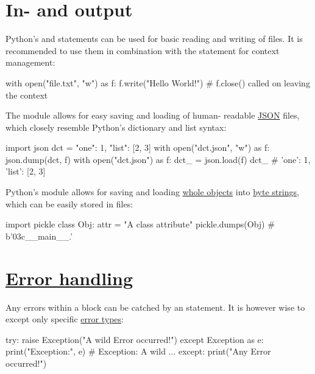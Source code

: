 \documentclass[rules]{cheatsheet}
\begin{document}
\section{In- and output}

Python's  and  statements can be used for basic reading and writing of files. It is recommended to use them in combination with the \href{https://docs.python.org/3/reference/compound_stmts.html#with}{} statement for context management:
\begin{python}
  with open("file.txt", "w") as f:
    f.write("Hello World!")
  # f.close() called on leaving the context
\end{python}

The \href{https://docs.python.org/3/library/json.html}{} module allows for easy saving and loading of human- readable \href{https://www.json.org/}{JSON} files, which closely resemble Python's dictionary and list syntax:
\begin{python}
  import json
  dct = {"one": 1, "list": [2, 3]}
  with open("dct.json", "w") as f:
    json.dump(dct, f)
  with open("dct.json") as f:
    dct_ = json.load(f)
  dct_ # {'one': 1, 'list': [2, 3]}
\end{python}

Python's \href{https://docs.python.org/3/library/pickle.html}{} module allows for saving and loading \href{https://docs.python.org/3/library/pickle.html#pickle-picklable}{whole objects} into \href{https://docs.python.org/3/library/stdtypes.html#bytes}{byte strings}, which can be easily stored in files:
\begin{python}
  import pickle
  class Obj:
    attr = "A class attribute"
  pickle.dumps(Obj) # b'\x03c__main__\nObj\nq{}.'
\end{python}

\section{\href{https://docs.python.org/3/tutorial/errors.html}{Error handling}}

Any errors within a \href{https://docs.python.org/3/reference/compound_stmts.html#try}{} block can be catched by an \href{https://docs.python.org/3/reference/compound_stmts.html#except}{} statement. It is however wise to except only specific \href{https://docs.python.org/3/library/exceptions.html#bltin-exceptions}{error types}:
\begin{python}
  try:
    raise Exception("A wild Error occurred!")
  except Exception as e:
    print("Exception:", e) # Exception: A wild ...
  except:
    print("Any Error occurred!")
\end{python}
\end{document}
